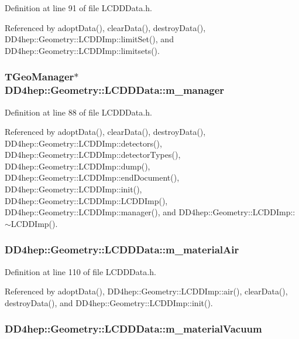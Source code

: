 Definition at line 91 of file LCDDData.h.

Referenced by adoptData(), clearData(), destroyData(), DD4hep::Geometry::LCDDImp::limitSet(), and DD4hep::Geometry::LCDDImp::limitsets().\hypertarget{class_d_d4hep_1_1_geometry_1_1_l_c_d_d_data_afd2dd18b9befa7e8ebb9a9ecf4faca03}{
\subsubsection[{m\_\-manager}]{\setlength{\rightskip}{0pt plus 5cm}TGeoManager$\ast$ {\bf DD4hep::Geometry::LCDDData::m\_\-manager}}}
\label{class_d_d4hep_1_1_geometry_1_1_l_c_d_d_data_afd2dd18b9befa7e8ebb9a9ecf4faca03}


Definition at line 88 of file LCDDData.h.

Referenced by adoptData(), clearData(), destroyData(), DD4hep::Geometry::LCDDImp::detectors(), DD4hep::Geometry::LCDDImp::detectorTypes(), DD4hep::Geometry::LCDDImp::dump(), DD4hep::Geometry::LCDDImp::endDocument(), DD4hep::Geometry::LCDDImp::init(), DD4hep::Geometry::LCDDImp::LCDDImp(), DD4hep::Geometry::LCDDImp::manager(), and DD4hep::Geometry::LCDDImp::$\sim$LCDDImp().\hypertarget{class_d_d4hep_1_1_geometry_1_1_l_c_d_d_data_ac4e5dcab68ed7a7e7799a5a2ae8705d8}{
\subsubsection[{m\_\-materialAir}]{ {\bf DD4hep::Geometry::LCDDData::m\_\-materialAir}}}
\label{class_d_d4hep_1_1_geometry_1_1_l_c_d_d_data_ac4e5dcab68ed7a7e7799a5a2ae8705d8}


Definition at line 110 of file LCDDData.h.

Referenced by adoptData(), DD4hep::Geometry::LCDDImp::air(), clearData(), destroyData(), and DD4hep::Geometry::LCDDImp::init().\hypertarget{class_d_d4hep_1_1_geometry_1_1_l_c_d_d_data_aa786b32f3e175bacb701cb50f164d144}{
\subsubsection[{m\_\-materialVacuum}]{ {\bf DD4hep::Geometry::LCDDData::m\_\-materialVacuum}}}
\label{class_d_d4hep_1_1_geometry_1_1_l_c_d_d_data_aa786b32f3e175bacb701cb50f164d144}


